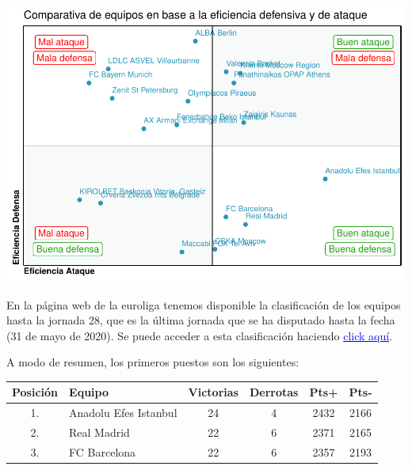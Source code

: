 \documentclass[
]{article}
\newenvironment{Shaded}{\begin{snugshade}}{\end{snugshade}}
\newcommand{\KeywordTok}[1]{\textcolor[rgb]{0.13,0.29,0.53}{\textbf{#1}}}
\newcommand{\NormalTok}[1]{#1}
\newcommand{\OperatorTok}[1]{\textcolor[rgb]{0.81,0.36,0.00}{\textbf{#1}}}
\newcommand{\StringTok}[1]{\textcolor[rgb]{0.31,0.60,0.02}{#1}}
\begin{document}
\begin{Shaded}
\end{Shaded}

\includegraphics{practica2_files/figure-latex/unnamed-chunk-92-1.pdf}

En la página web de la euroliga tenemos disponible la clasificación de
los equipos hasta la jornada 28, que es la última jornada que se ha
disputado hasta la fecha (31 de mayo de 2020). Se puede acceder a esta
clasificación haciendo
\href{https://www.euroleague.net/main/standings?gamenumber=28\&phasetypecode=RS\&seasoncode=E2019}{\textcolor{blue}{click aquí}}.

A modo de resumen, los primeros puestos son los siguientes:

\begin{longtable}[]{@{}clcccc@{}}
\toprule
\textbf{Posición} & \textbf{Equipo} & \textbf{Victorias} &
\textbf{Derrotas} & \textbf{Pts+} & \textbf{Pts-}\tabularnewline
\midrule
\endhead
1. & Anadolu Efes Istanbul & 24 & 4 & 2432 & 2166\tabularnewline
2. & Real Madrid & 22 & 6 & 2371 & 2165\tabularnewline
3. & FC Barcelona & 22 & 6 & 2357 & 2193\tabularnewline
\bottomrule
\end{longtable}
\end{document}
